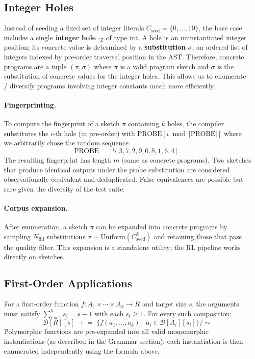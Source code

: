 \documentclass[11pt,a4paper]{article}
\begin{document}
\subsection{Integer Holes}\label{sec:holes}

Instead of seeding a fixed set of integer literals $C_{\text{seed}} = \{0,\ldots,10\}$,
the base case includes a single \textbf{integer hole} $\square_{\mathbb{Z}}$ of type
$\mathrm{int}$. A hole is an uninstantiated integer position; its concrete value is
determined by a \textbf{substitution} $\sigma$, an ordered list of integers indexed by
pre-order traversal position in the AST. Therefore, concrete programs are a tuple $(\pi, \sigma)$ where $\pi$ is a valid program sketch and $\sigma$ is the substitution of concrete values for the integer holes. This allows us to enumerate / diversify programs involving integer constants much more efficiently.

\paragraph{Fingerprinting.}
To compute the fingerprint of a sketch $\pi$ containing $k$ holes, the compiler
substitutes the $i$-th hole (in pre-order) with
$\mathrm{PROBE}[i \bmod |\mathrm{PROBE}|]$ where we arbitrarily chose the random sequence
\[
  \mathrm{PROBE} = [5, 3, 7, 2, 9, 0, 8, 1, 6, 4].
\]
The resulting fingerprint has length $m$ (same as concrete programs). Two sketches
that produce identical outputs under the probe substitution are considered
observationally equivalent and deduplicated. False equivalences are possible but
rare given the diversity of the test suite.

\paragraph{Corpus expansion.}
After enumeration, a sketch $\pi$ can be expanded into concrete programs by
sampling $N_{\mathrm{fill}}$ substitutions
$\sigma \sim \mathrm{Uniform}(C_{\mathrm{seed}}^k)$ and retaining those that pass
the quality filter. This expansion is a standalone utility; the RL pipeline works
directly on sketches.

\subsection{First-Order Applications}\label{sec:first-order}

For a first-order function $f : A_1 \times \cdots \times A_k \to R$ and target size $s$,
the arguments must satisfy $\sum_{i=1}^k s_i = s - 1$ with each $s_i \geq 1$. For every
such composition:
\[
  \mathcal{B}[R][s]
    \;\mathrel{+}=\;
    \bigl\{f(a_1, \ldots, a_k) \;\big|\; a_i \in \mathcal{B}[A_i][s_i]\bigr\}
    \!\Big/\!\sim
\]
Polymorphic functions are pre-expanded into all valid monomorphic instantiations (as
described in the Grammar section); each instantiation is then enumerated independently
using the formula above.
\end{document}
